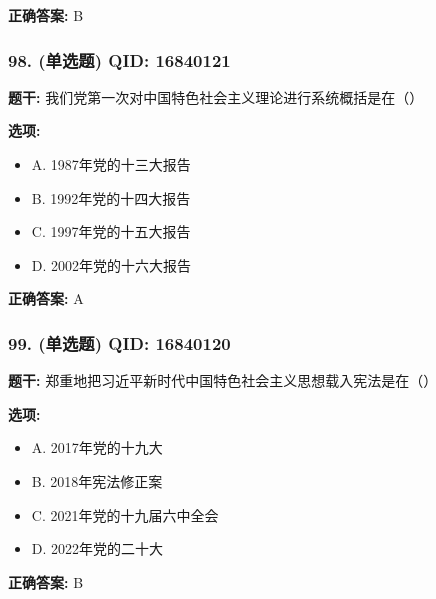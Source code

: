 \documentclass[12pt,UTF8]{ctexart}
\begin{document}
\textbf{正确答案:}
B

\vspace{0.3em}\hrulefill\vspace{0.7em}

\subsubsection*{98. (单选题) \small QID: 16840121}

\textbf{题干:}
我们党第一次对中国特色社会主义理论进行系统概括是在（）

\textbf{选项:}
\begin{itemize}[leftmargin=*]

  \item A. 1987年党的十三大报告

  \item B. 1992年党的十四大报告

  \item C. 1997年党的十五大报告

  \item D. 2002年党的十六大报告

\end{itemize}

\textbf{正确答案:}
A

\vspace{0.3em}\hrulefill\vspace{0.7em}

\subsubsection*{99. (单选题) \small QID: 16840120}

\textbf{题干:}
郑重地把习近平新时代中国特色社会主义思想载入宪法是在（）

\textbf{选项:}
\begin{itemize}[leftmargin=*]

  \item A. 2017年党的十九大

  \item B. 2018年宪法修正案

  \item C. 2021年党的十九届六中全会

  \item D. 2022年党的二十大

\end{itemize}

\textbf{正确答案:}
B

\vspace{0.3em}\hrulefill\vspace{0.7em}
\end{document}
